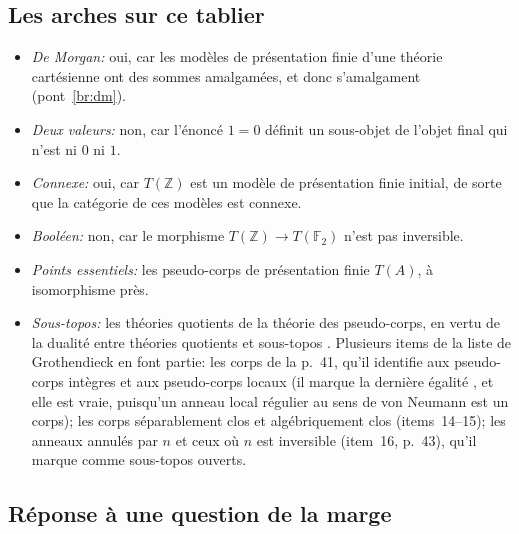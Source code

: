 \subsection{Les arches sur ce tablier}

\begin{itemize}
\item \emph{De Morgan:} oui, car les modèles de présentation finie d'une théorie cartésienne ont des sommes amalgamées, et donc s'amalgament (pont~\ref{br:dm}).
\item \emph{Deux valeurs:} non, car l'énoncé $1=0$ définit un sous-objet de l'objet final qui n'est ni $0$ ni $1$.
\item \emph{Connexe:} oui, car $T(\mathbb Z)$ est un modèle de présentation finie initial, de sorte que la catégorie de ces modèles est connexe.
\item \emph{Booléen:} non, car le morphisme $T(\mathbb Z)\to T(\mathbb F_2)$ n'est pas inversible.
\item \emph{Points essentiels:} les pseudo-corps de présentation finie $T(A)$, à isomorphisme près.
\item \emph{Sous-topos:} les théories quotients de la théorie des pseudo-corps, en vertu de la dualité entre théories quotients et sous-topos \cite{caramello-tst}. Plusieurs items de la liste de Grothendieck en font partie: les corps de la p.~41, qu'il identifie aux pseudo-corps intègres et aux pseudo-corps locaux (il marque la dernière égalité , et elle est vraie, puisqu'un anneau local régulier au sens de von Neumann est un corps); les corps séparablement clos et algébriquement clos (items~14--15); les anneaux annulés par $n$ et ceux où $n$ est inversible (item~16, p.~43), qu'il marque comme sous-topos ouverts.
\end{itemize}

\subsection{Réponse à une question de la marge}

